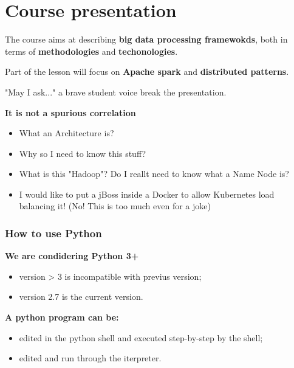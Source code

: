 \section{Course presentation}



The course aims at describing \textbf{big data processing framewokds}, both in terms of \textbf{methodologies} and \textbf{techonologies}.

Part of the lesson will focus on \textbf{Apache spark} and \textbf{distributed patterns}.

"May I ask..." a brave student voice break the presentation.

\textbf{It is not a spurious correlation}
\begin{itemize}
	\item What an Architecture is? 
	\item Why so I need to know this stuff?
	\item What is this "Hadoop"? Do I reallt need to know what a Name Node is?
	\item I would like to put a jBoss inside a Docker to allow Kubernetes load balancing it! (No! This is too much even for a joke)
\end{itemize}

\subsubsection{How to use Python}	
\textbf{We are condidering Python 3+}
\begin{itemize}
	\item version > 3 is incompatible with previus version;
	\item version 2.7 is the current version.
\end{itemize}
\textbf{A python program can be:}
\begin{itemize}
	\item edited in the python shell and executed step-by-step by the shell;
	\item edited and run through the iterpreter.
\end{itemize}

